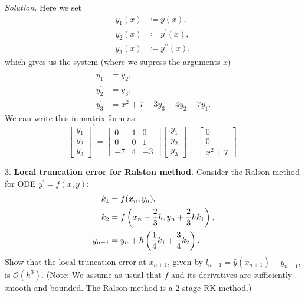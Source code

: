 \documentclass{article}
\newcommand{\Oh}{\mathcal{O}}
\begin{document}
\textit{Solution.}
Here we set
%
\begin{align*}
    y_1(x) &\coloneqq y(x), \\
    y_2(x) &\coloneqq y^\prime(x), \\
    y_3(x) &\coloneqq y^{\prime \prime} (x),
\end{align*}
%
which gives us the system (where we supress the arguments $x$)
%
\begin{align*}
    y_1^\prime &= y_2, \\
    y_2^\prime &= y_3, \\
    y_3^\prime &= x^2 + 7 - 3 y_3 + 4 y_2 - 7 y_1.
\end{align*}
%
We can write this in matrix form as
%
\begin{equation*}
    \begin{bmatrix}
        y_1 \\
        y_2 \\
        y_3
    \end{bmatrix}^\prime
    =
    \begin{bmatrix}
        0 & 1 & 0 \\
        0 & 0 & 1 \\
        -7 & 4 & -3
    \end{bmatrix}
    \begin{bmatrix}
        y_1 \\
        y_2 \\
        y_3
    \end{bmatrix}
    +
   \begin{bmatrix}
       0 \\
       0 \\
       x^2 + 7
   \end{bmatrix}
   .
\end{equation*}

\newpage

3. \textbf{Local truncation error for Ralston method.}
Consider the Ralson method for ODE $y^\prime = f(x, y)$:
%
\begin{align*}
    k_1 &= f(x_n, y_n), \\
    k_2 &= f\del{x_n + \frac{2}{3} h, y_n + \frac{2}{3}h k_1}, \\
    y_{n + 1} &= y_n + h \del{\frac{1}{4} k_1 + \frac{3}{4} k_2}.
\end{align*}
%
Show that the local truncation error at $x_{n + 1}$, given by
$l_{n + 1} = \hat{y}(x_{n + 1}) - y_{n - 1}$, is $\Oh(h^3)$.
(Note: We assume as usual that $f$ and its derivatives are sufficiently smooth and bounded. The Ralson method is a 2-stage RK method.)
\end{document}
